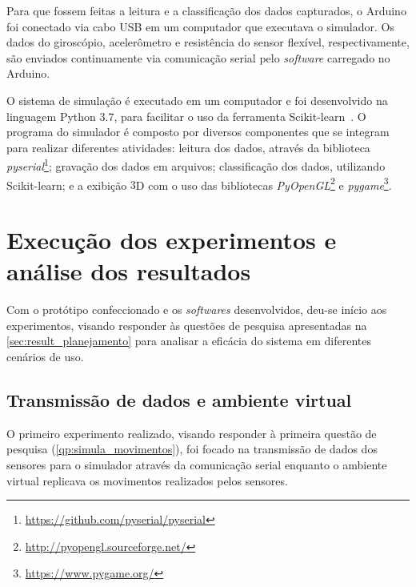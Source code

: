 Para que fossem feitas a leitura e a classificação dos dados capturados, o Arduino foi conectado via cabo USB em um computador que executava o simulador. Os dados do giroscópio, acelerômetro e resistência do sensor flexível, respectivamente, são enviados continuamente via comunicação serial pelo \textit{software} carregado no Arduino.



O sistema de simulação é executado em um computador e foi desenvolvido na linguagem Python $3.7$, para facilitar o uso da ferramenta Scikit-learn~\cite{pedregosa:2011}. O programa do simulador é composto por diversos componentes que se integram para realizar diferentes atividades: leitura dos dados, através da biblioteca \textit{pyserial}\footnote{\url{https://github.com/pyserial/pyserial}}; gravação dos dados em arquivos; classificação dos dados, utilizando Scikit-learn; e a exibição $3$D com o uso das bibliotecas \textit{PyOpenGL}\footnote{\url{http://pyopengl.sourceforge.net/}} e \textit{pygame}\footnote{\url{https://www.pygame.org/}}.

%
\section{Execução dos experimentos e análise dos resultados}\label{sec:result_execucao}
%
Com o protótipo confeccionado e os \textit{softwares} desenvolvidos, deu-se início aos experimentos, visando responder às questões de pesquisa apresentadas na \autoref{sec:result_planejamento} para analisar a eficácia do sistema \productname{} em diferentes cenários de uso.

\subsection{Transmissão de dados e ambiente virtual}

O primeiro experimento realizado, visando responder à primeira questão de pesquisa (\ref{qp:simula_movimentos}), foi focado na transmissão de dados dos sensores para o simulador através da comunicação serial enquanto o ambiente virtual replicava os movimentos realizados pelos sensores.

